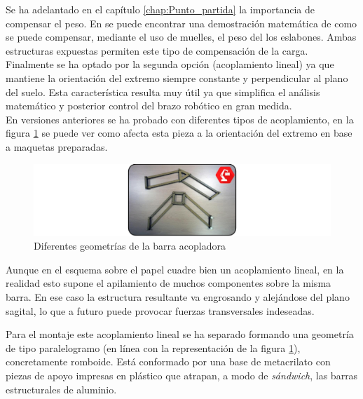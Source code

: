     Se ha adelantado en el capítulo \ref{chap:Punto_partida} la importancia de compensar el peso. En \cite{Rahman_asimple} se puede encontrar una demostración matemática de como se puede compensar, mediante el uso de muelles, el peso del los eslabones. Ambas estructuras expuestas permiten este tipo de compensación de la carga. Finalmente se ha optado por la segunda opción (acoplamiento lineal) ya que mantiene la orientación del extremo siempre constante y perpendicular al plano del suelo. Esta característica resulta muy útil ya que simplifica el análisis matemático y posterior control del brazo robótico en gran medida.
    \\
    
    En versiones anteriores se ha probado con diferentes tipos de acoplamiento, en la figura \ref{fig:Mecanica:geometria_acopladora} se puede ver como afecta esta pieza a la orientación del extremo en base a maquetas preparadas.
    
    \begin{figure}[H]
    	\centering
    	\includegraphics[width=\textwidth]{figuras/Imagenes_Mecanica/transicion_maqueta.jpg}
    	\caption{Diferentes geometrías de la barra acopladora}
    	\label{fig:Mecanica:geometria_acopladora}
    \end{figure}

    Aunque en el esquema sobre el papel cuadre bien un acoplamiento lineal, en la realidad esto supone el apilamiento de muchos componentes sobre la misma barra. En ese caso la estructura resultante va engrosando y alejándose del plano sagital, lo que a futuro puede provocar fuerzas transversales indeseadas. 
    
    Para el montaje este acoplamiento lineal se ha separado formando una geometría de tipo paralelogramo (en línea con la representación de la figura \ref{fig:Mecanica:geometria_acopladora}), concretamente romboide. Está conformado por una base de metacrilato con piezas de apoyo impresas en plástico que atrapan, a modo de \textit{sándwich}, las barras estructurales de aluminio.

